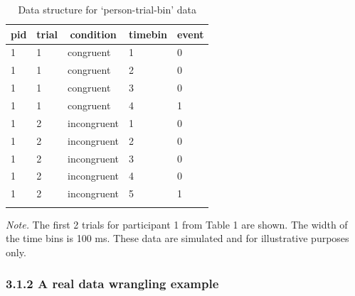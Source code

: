 \documentclass[
  english,
  man, donotrepeattitle,floatsintext]{apa6}
\begin{document}
\renewcommand{\arraystretch}{1.5}

\begin{table}[H]

\begin{center}
\begin{threeparttable}

\caption{\label{tab:ha-data-table}Data structure for `person-trial-bin' data}

\begin{tabular}{lllll}
\toprule
pid & \multicolumn{1}{c}{trial} & \multicolumn{1}{c}{condition} & \multicolumn{1}{c}{timebin} & \multicolumn{1}{c}{event}\\
\midrule
1 & 1 & congruent & 1 & 0\\
1 & 1 & congruent & 2 & 0\\
1 & 1 & congruent & 3 & 0\\
1 & 1 & congruent & 4 & 1\\
1 & 2 & incongruent & 1 & 0\\
1 & 2 & incongruent & 2 & 0\\
1 & 2 & incongruent & 3 & 0\\
1 & 2 & incongruent & 4 & 0\\
1 & 2 & incongruent & 5 & 1\\
\bottomrule
\addlinespace
\end{tabular}

\begin{tablenotes}[para]
\normalsize{\textit{Note.} The first 2 trials for participant 1 from Table 1 are shown. The width of the time bins is 100 ms. These data are simulated and for illustrative purposes only.}
\end{tablenotes}

\end{threeparttable}
\end{center}

\end{table}

\renewcommand{\arraystretch}{1}

\subsubsection{3.1.2 A real data wrangling example}\label{a-real-data-wrangling-example}
\end{document}
